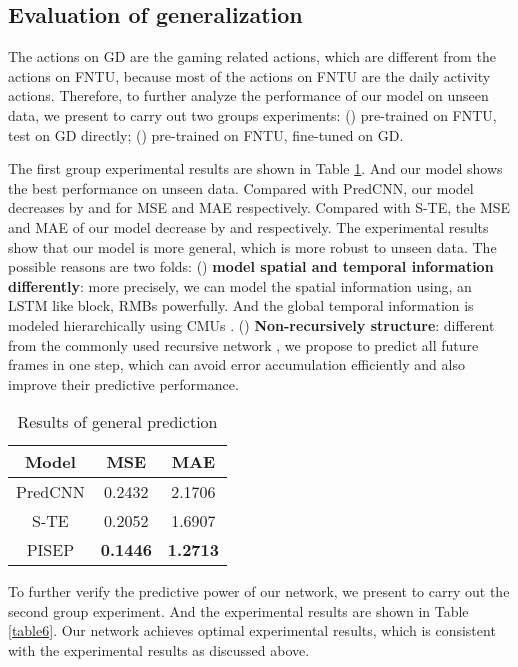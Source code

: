 \documentclass[journal]{IEEEtran}
\begin{document}
\subsection{Evaluation of generalization}
The actions on GD are the gaming related actions, which are different from the actions on FNTU, because most of the actions on FNTU are the daily activity actions. Therefore, to further analyze the performance of our model on unseen data, we present to carry out two groups experiments: () pre-trained on FNTU, test on GD directly; () pre-trained on FNTU, fine-tuned on GD.

The first group experimental results are shown in Table \ref{table5}. And our model shows the best performance on unseen data. Compared with PredCNN, our model decreases by  and  for MSE and MAE respectively. Compared with S-TE\cite{ButepageDRL}, the MSE and MAE of our model decrease by  and  respectively. The experimental results show that our model is more general, which is more robust to unseen data. The possible reasons are two folds: () {\bf model spatial and temporal information differently}: more precisely, we can model the spatial information using, an LSTM like block, RMBs \cite{vpn} powerfully. And the global temporal information is modeled hierarchically using CMUs \cite{predcnn}. () {\bf Non-recursively structure}: different from the commonly used recursive network \cite{predcnn}, we propose to predict all future frames in one step, which can avoid error accumulation efficiently and also improve their predictive performance.

\begin{table}[!t]
\renewcommand{\arraystretch}{1.3}
\caption{Results of general prediction}
\label{table5}
\centering
\begin{tabular}{ccc}
\hline
Model&MSE&MAE \\
\hline
PredCNN\cite{predcnn}&0.2432&2.1706 \\
S-TE\cite{ButepageDRL}&0.2052&1.6907 \\
PISEP &{\bf 0.1446}&{\bf 1.2713} \\
\hline
\end{tabular}
\end{table}


To further verify the predictive power of our network, we present to carry out the second group experiment. And the experimental results are shown in Table \ref{table6}. Our network achieves optimal experimental results, which is consistent with the experimental results as discussed above.
\end{document}
